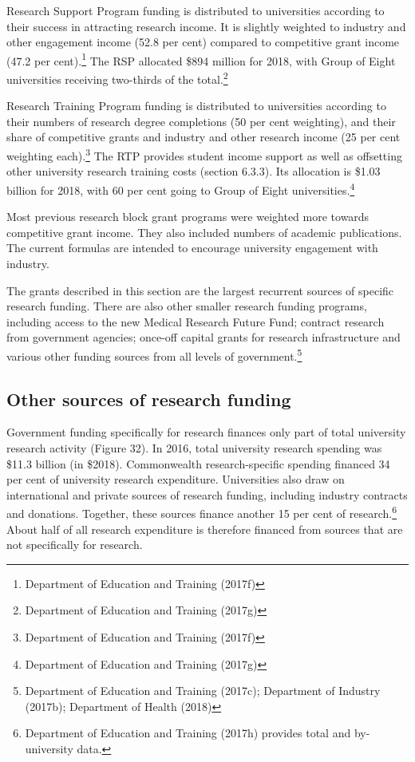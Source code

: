 \documentclass[]{book}
\begin{document}
Research Support Program funding is distributed to universities according to their success in attracting research income. It is slightly weighted to industry and other engagement income (52.8 per cent) compared to competitive grant income (47.2 per cent).\footnote{Department of Education and Training (2017f)} The RSP allocated \$894 million for 2018, with Group of Eight universities receiving two-thirds of the total.\footnote{Department of Education and Training (2017g)}

Research Training Program funding is distributed to universities according to their numbers of research degree completions (50 per cent weighting), and their share of competitive grants and industry and other research income (25 per cent weighting each).\footnote{Department of Education and Training (2017f)} The RTP provides student income support as well as offsetting other university research training costs (section 6.3.3). Its allocation is \$1.03 billion for 2018, with 60 per cent going to Group of Eight universities.\footnote{Department of Education and Training (2017g)}

Most previous research block grant programs were weighted more towards competitive grant income. They also included numbers of academic publications. The current formulas are intended to encourage university engagement with industry.

The grants described in this section are the largest recurrent sources of specific research funding. There are also other smaller research funding programs, including access to the new Medical Research Future Fund; contract research from government agencies; once-off capital grants for research infrastructure and various other funding sources from all levels of government.\footnote{Department of Education and Training (2017c); Department of Industry (2017b); Department of Health (2018)}

\hypertarget{other-sources-of-research-funding}{%
\subsection{Other sources of research funding}\label{other-sources-of-research-funding}}

Government funding specifically for research finances only part of total university research activity (Figure 32). In 2016, total university research spending was \$11.3 billion (in \$2018). Commonwealth research-specific spending financed 34 per cent of university research expenditure. Universities also draw on international and private sources of research funding, including industry contracts and donations. Together, these sources finance another 15 per cent of research.\footnote{Department of Education and Training (2017h) provides total and by-university data.} About half of all research expenditure is therefore financed from sources that are not specifically for research.
\end{document}
